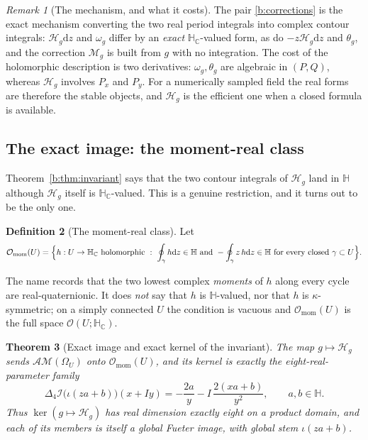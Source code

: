 \documentclass[11pt,a4paper]{article}
\numberwithin{equation}{section}
\newtheorem{theorem}{Theorem}[section]
\theoremstyle{definition}
\newtheorem{definition}[theorem]{Definition}
\theoremstyle{remark}
\newtheorem{remark}[theorem]{Remark}
\theoremstyle{plain}
\newcommand{\HH}{\mathbb H}
\newcommand{\HC}{\mathbb H_{\mathbb C}}
\newcommand{\lap}{\Delta_4}
\newcommand{\I}{\mathcal I}
\newcommand{\AM}{\mathcal{AM}}
\newcommand{\Om}{\Omega}
\newcommand{\Omom}{\mathcal O_{\mathrm{mom}}}
\newcommand{\om}{\omega}
\newcommand{\thet}{\theta}
\newcommand{\Hg}{\mathcal H_{g}}      %
\newcommand{\dd}{\mathrm d}
\begin{document}
\begin{remark}[The mechanism, and what it costs]
\label{b:rem:mechanism}
The pair \eqref{b:corrections} is the exact mechanism converting the two real
period integrals into complex contour integrals: $\Hg\dd z$ and $\om_g$
differ by an \emph{exact} $\HC$-valued form, as do $-z\Hg\dd z$ and
$\thet_g$, and the correction $\mathcal M_g$ is built from $g$ with no
integration.  The cost of the holomorphic description is two derivatives:
$\om_g,\thet_g$ are algebraic in $(P,Q)$, whereas $\Hg$ involves $P_x$ and
$P_y$.  For a numerically sampled field the real forms are therefore the
stable objects, and $\Hg$ is the efficient one when a closed formula is
available.
\end{remark}

\subsection{The exact image: the moment-real class}
\label{b:sub:image}

Theorem~\ref{b:thm:invariant} says that the two contour integrals of $\Hg$
land in $\HH$ although $\Hg$ itself is $\HC$-valued.  This is a genuine
restriction, and it turns out to be the only one.

\begin{definition}[The moment-real class]
\label{b:def:omom}
Let
\begin{equation}
 \Omom(U)=\Bigl\{h:U\to\HC\ \text{holomorphic}\ :\
 \oint_\gamma h\dd z\in\HH\ \text{and}\
 -\oint_\gamma z\,h\dd z\in\HH\ \text{for every closed }\gamma\subset U\Bigr\}.
 \label{b:omom}
\end{equation}
\end{definition}

The name records that the two lowest complex \emph{moments} of $h$ along every
cycle are real-quaternionic.  It does \emph{not} say that $h$ is
$\HH$-valued, nor that $h$ is $\kappa$-symmetric; on a simply connected $U$
the condition is vacuous and $\Omom(U)$ is the full space
$\mathcal O(U;\HC)$.

\begin{theorem}[Exact image and exact kernel of the invariant]
\label{b:thm:range}
The map $g\mapsto\Hg$ sends $\AM(\Om_U)$ \emph{onto} $\Omom(U)$, and its
kernel is exactly the eight-real-parameter family
\begin{equation}
 \lap\I\bigl(\iota(za+b)\bigr)(x+Iy)
 =-\frac{2a}{y}-I\,\frac{2(xa+b)}{y^2},
 \qquad a,b\in\HH .
 \label{b:Hkernel}
\end{equation}
Thus $\ker(g\mapsto\Hg)$ has real dimension exactly eight on a product
domain, and each of its members is itself a global Fueter image, with global
stem $\iota(za+b)$.
\end{theorem}
\end{document}
